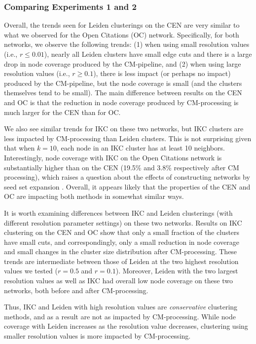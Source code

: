 \documentclass[11pt]{article}   	%
\begin{document}
\subsubsection{Comparing Experiments 1 and 2}
Overall, the  trends seen for Leiden clusterings on the CEN are  very similar to what we observed for the Open Citations (OC) network.
Specifically, for both networks, we observe the following  trends: (1) when using small resolution values (i.e., $r \leq 0.01$),  nearly all Leiden clusters have small edge cuts and there is a large drop in node coverage produced by the CM-pipeline, and  (2) when using
large resolution values (i.e., $r \geq 0.1$), there is less impact (or perhaps no impact) produced by the CM-pipeline, but the node coverage is small (and the clusters themselves tend to be small).
The main difference between results on the CEN and OC is that the reduction in node coverage produced by CM-processing is
much larger  for the CEN than for OC.

We also see similar trends for IKC on these two networks, but IKC clusters are less impacted by CM-processing than Leiden clusters. This is not surprising given that when $k=10$, each node in an IKC cluster
has at least 10 neighbors. Interestingly, node coverage with IKC on the Open Citations network is substantially higher than on the CEN (19.5\% and 3.8\% respectively after CM processing), which raises a question about
the effects of constructing networks by seed set expansion \cite{Wedell2022}. Overall, it appears likely that the properties of the CEN and OC are impacting both methods in somewhat similar ways.

It is worth examining differences between IKC and Leiden clusterings (with different resolution parameter settings) on these two networks.
Results on IKC clustering on the CEN and OC show that only a small fraction of the clusters have small cuts, and correspondingly,
only a small reduction in node coverage and small changes in the cluster size distribution after CM-processing.
These trends  are intermediate between those of Leiden at the two highest resolution values we tested ($r=0.5$ and $r=0.1$).
Moreover, Leiden with the two largest resolution values as well as IKC had overall low node coverage on these two networks, both before and after CM-processing.

Thus, IKC and Leiden with high resolution values are {\em conservative} clustering methods, and as a result are not as impacted by CM-processing.
While node coverage with Leiden increases as the resolution value decreases, clustering using smaller resolution values is more impacted by CM-processing.
\end{document}
